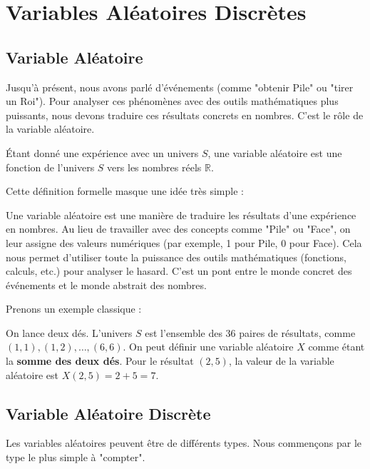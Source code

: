 \newpage
\section{Variables Aléatoires Discrètes}

\subsection{Variable Aléatoire}

Jusqu'à présent, nous avons parlé d'événements (comme "obtenir Pile" ou "tirer un Roi"). Pour analyser ces phénomènes avec des outils mathématiques plus puissants, nous devons traduire ces résultats concrets en nombres. C'est le rôle de la variable aléatoire.

\begin{definitionbox}
Étant donné une expérience avec un univers $S$, une variable aléatoire est une fonction de l'univers $S$ vers les nombres réels $\mathbb{R}$.
\end{definitionbox}

Cette définition formelle masque une idée très simple :

\begin{intuitionbox}
Une variable aléatoire est une manière de traduire les résultats d'une expérience en nombres. Au lieu de travailler avec des concepts comme "Pile" ou "Face", on leur assigne des valeurs numériques (par exemple, 1 pour Pile, 0 pour Face). Cela nous permet d'utiliser toute la puissance des outils mathématiques (fonctions, calculs, etc.) pour analyser le hasard. C'est un pont entre le monde concret des événements et le monde abstrait des nombres.
\end{intuitionbox}

Prenons un exemple classique :

\begin{examplebox}
On lance deux dés. L'univers $S$ est l'ensemble des 36 paires de résultats, comme $(1,1), (1,2), \dots, (6,6)$. On peut définir une variable aléatoire $X$ comme étant la \textbf{somme des deux dés}.
Pour le résultat $(2, 5)$, la valeur de la variable aléatoire est $X(2, 5) = 2 + 5 = 7$.
\end{examplebox}

\subsection{Variable Aléatoire Discrète}

Les variables aléatoires peuvent être de différents types. Nous commençons par le type le plus simple à "compter".

